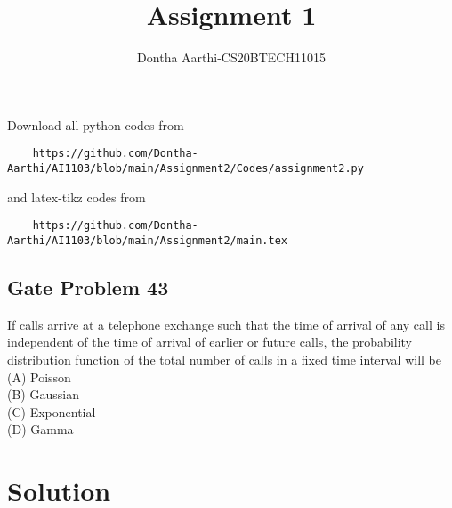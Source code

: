 \documentclass[journal,12pt,twocolumn]{IEEEtran}
\begin{document}
\vspace{3cm}
\title{Assignment 1}
\author{Dontha Aarthi-CS20BTECH11015}
\maketitle
\newpage
\bigskip
\renewcommand{\thefigure}{\theenumi}
\renewcommand{\thetable}{\theenumi}
Download all python codes from 
\begin{lstlisting}
    https://github.com/Dontha-Aarthi/AI1103/blob/main/Assignment2/Codes/assignment2.py
\end{lstlisting}
%
and latex-tikz codes from 
%
\begin{lstlisting}
    https://github.com/Dontha-Aarthi/AI1103/blob/main/Assignment2/main.tex
\end{lstlisting}
\begin{center}
  \section{\textbf{Gate Problem 43}} 
\end{center}
    If calls arrive at a telephone exchange such that
the time of arrival of any call is independent
of the time of arrival of earlier or future calls,
the probability distribution function of the total
number of calls in a fixed time interval will be\\
(A) Poisson\\
(B) Gaussian\\
(C) Exponential\\
(D) Gamma\\

\section{Solution}
\end{document}
